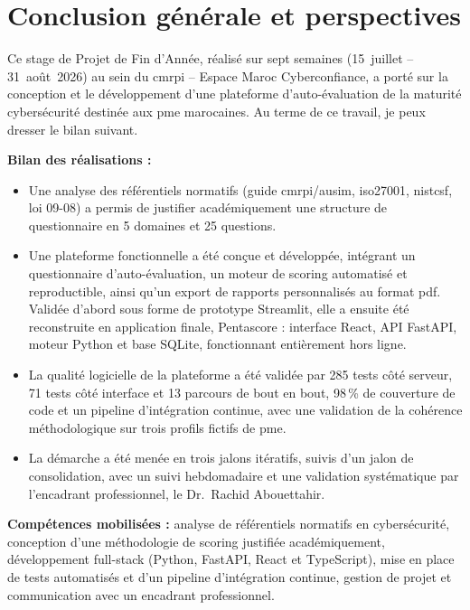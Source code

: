 \chapter*{Conclusion générale et perspectives}

\hspace{1cm}Ce stage de Projet de Fin d'Année, réalisé sur sept semaines (15~juillet -- 31~août~2026) au sein du \gls{cmrpi} -- Espace Maroc Cyberconfiance, a porté sur la conception et le développement d'une plateforme d'auto-évaluation de la maturité cybersécurité destinée aux \gls{pme} marocaines. Au terme de ce travail, je peux dresser le bilan suivant.

\vspace{0.5cm}
\textbf{Bilan des réalisations :}

\begin{itemize}
  \item Une analyse des référentiels normatifs (guide \gls{cmrpi}/\gls{ausim}, \gls{iso27001}, \gls{nistcsf}, loi 09-08) a permis de justifier académiquement une structure de questionnaire en 5 domaines et 25 questions.
  \item Une plateforme fonctionnelle a été conçue et développée, intégrant un questionnaire d'auto-évaluation, un moteur de scoring automatisé et reproductible, ainsi qu'un export de rapports personnalisés au format \gls{pdf}. Validée d'abord sous forme de prototype Streamlit, elle a ensuite été reconstruite en application finale, Pentascore : interface React, API FastAPI, moteur Python et base SQLite, fonctionnant entièrement hors ligne.
  \item La qualité logicielle de la plateforme a été validée par 285 tests côté serveur, 71 tests côté interface et 13 parcours de bout en bout, 98\,\% de couverture de code et un pipeline d'intégration continue, avec une validation de la cohérence méthodologique sur trois profils fictifs de \gls{pme}.
  \item La démarche a été menée en trois jalons itératifs, suivis d'un jalon de consolidation, avec un suivi hebdomadaire et une validation systématique par l'encadrant professionnel, le Dr.~Rachid Abouettahir.
\end{itemize}

\vspace{0.5cm}
\textbf{Compétences mobilisées :} analyse de référentiels normatifs en cybersécurité, conception d'une méthodologie de scoring justifiée académiquement, développement full-stack (Python, FastAPI, React et TypeScript), mise en place de tests automatisés et d'un pipeline d'intégration continue, gestion de projet et communication avec un encadrant professionnel.


